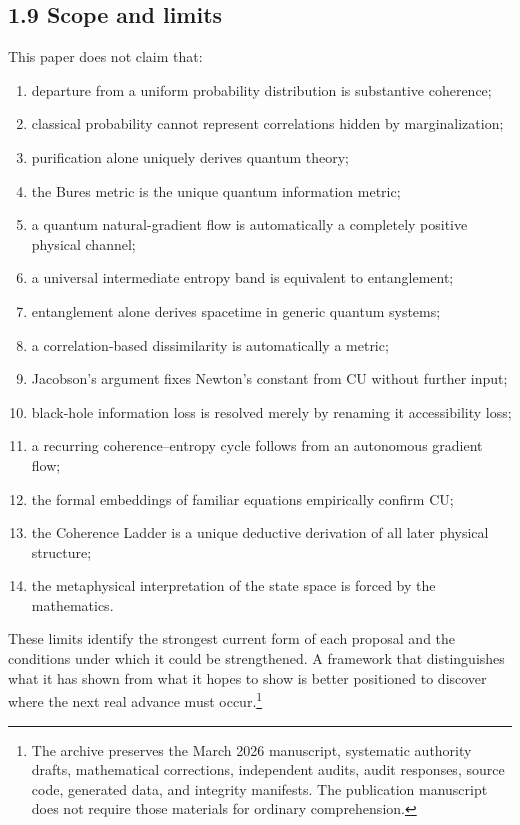 \documentclass[
  11pt,
]{article}
\providecommand{\tightlist}{%
  \setlength{\itemsep}{0pt}\setlength{\parskip}{0pt}}
\begin{document}
\subsection{1.9 Scope and limits}\label{scope-and-limits}

This paper does not claim that:

\begin{enumerate}
\def\labelenumi{\arabic{enumi}.}
\tightlist
\item
  departure from a uniform probability distribution is substantive
  coherence;
\item
  classical probability cannot represent correlations hidden by
  marginalization;
\item
  purification alone uniquely derives quantum theory;
\item
  the Bures metric is the unique quantum information metric;
\item
  a quantum natural-gradient flow is automatically a completely positive
  physical channel;
\item
  a universal intermediate entropy band is equivalent to entanglement;
\item
  entanglement alone derives spacetime in generic quantum systems;
\item
  a correlation-based dissimilarity is automatically a metric;
\item
  Jacobson's argument fixes Newton's constant from CU without further
  input;
\item
  black-hole information loss is resolved merely by renaming it
  accessibility loss;
\item
  a recurring coherence--entropy cycle follows from an autonomous
  gradient flow;
\item
  the formal embeddings of familiar equations empirically confirm CU;
\item
  the Coherence Ladder is a unique deductive derivation of all later
  physical structure;
\item
  the metaphysical interpretation of the state space is forced by the
  mathematics.
\end{enumerate}

These limits identify the strongest current form of each proposal and
the conditions under which it could be strengthened. A framework that
distinguishes what it has shown from what it hopes to show is better
positioned to discover where the next real advance must
occur.\footnote{The archive preserves the March 2026 manuscript,
  systematic authority drafts, mathematical corrections, independent
  audits, audit responses, source code, generated data, and integrity
  manifests. The publication manuscript does not require those materials
  for ordinary comprehension.}
\end{document}
